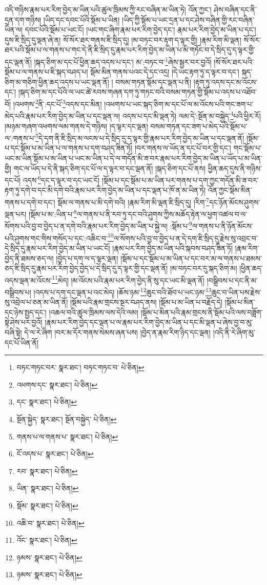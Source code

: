 འདི་གཉིས་རྣམ་པར་རིག་བྱེད་མ་ཡིན་པའི་ཚུལ་ཁྲིམས་ཀྱི་རང་བཞིན་མ་ཡིན་ཏེ། འོན་ཀྱང་། ཤེས་བཞིན་དང་ནི་དྲན་དག་གཉིས། །ཡིད་དང་དབང་པོའི་སྡོམ་པ་ཡིན། །ཡིད་ཀྱི་སྡོམ་པ་ཡང་དྲན་པ་དང་ཤེས་བཞིན་གྱི་རང་བཞིན་ཡིན་ལ། དབང་པོའི་སྡོམ་པ་ཡང་ངོ། །ཡང་གང་ཞིག་རྣམ་པར་རིག་བྱེད་དང་། རྣམ་པར་རིག་བྱེད་མ་ཡིན་པ་དང་། དུས་ཇི་སྲིད་དུ་ལྡན་ཞེ་ན། སོ་སོར་ཐར་གནས་ཇི་སྲིད་དུ། །མ་བཏང་བར་རྟག་ད་ལྟར་གྱི། །རྣམ་རིག་མི་ལྡན། སོ་སོར་ཐར་པའི་སྡོམ་པ་ལ་གནས་པ་གང་དེ་ནི་ཇི་སྲིད་དུ་རྣམ་པར་རིག་བྱེད་མ་ཡིན་པ་མི་གཏོང་བ་དེ་སྲིད་དུ་ད་ལྟར་གྱི་དང་ལྡན་ནོ། །སྐད་ཅིག་མ་དང་པོ་ཕྱིན་ཆད་འདས་པ་དང་། མ་:བཏང་བ་\footnote{བཏང་གཏང་བར་  སྣར་ཐང་། བཏང་གཏང་བ་  པེ་ཅིན། }ཞེས་སྦྱར་བར་བྱའོ། །སོ་སོར་ཐར་པའི་སྡོམ་པ་ལ་གནས་པ་ཇི་སྐད་བཤད་པ། སྡོམ་མིན་གནས་པའང་དེ་དང་འདྲ། །དེ་ཡང་རྟག་ཏུ་ད་ལྟར་བ་དང་། སྐད་ཅིག་མ་གཅིག་ཕྱིན་ཆད་འདས་པ་ཡང་ལྡན་ནོ། །
བསམ་གཏན་སྡོམ་དང་ལྡན་པ་ནི། །རྟག་ཏུ་འདས་དང་མ་འོངས་དང་། །སྐད་ཅིག་མ་དང་པོའི་ལ་ཡང་ཚེ་རབས་གཞན་དག་ཏུ་གཏང་བའི་བསམ་གཏན་གྱི་སྡོམ་པ་འདས་པ་འཐོབ་བོ། །འཕགས་\footnote{འཕགས་དང་  སྣར་ཐང་།  པེ་ཅིན། }ནི་:དང་པོ་\footnote{དང་  སྣར་ཐང་།  པེ་ཅིན། }འདས་དང་མིན། །འཕགས་པ་ཡང་སྐད་ཅིག་མ་དང་པོ་ལ་མ་འོངས་པའི་གང་ཟག་པ་མེད་པའི་རྣམ་པར་རིག་བྱེད་མ་ཡིན་པ་དང་ལྡན་ལ། འདས་པ་དང་མི་ལྡན་ཏེ། ལམ་དེ་:སྔོན་མ་བསྐྱེད་\footnote{སྔོན་སྐྱེད་  སྣར་ཐང་། སྔོན་བསྐྱེད་  པེ་ཅིན། }པའི་ཕྱིར་རོ། །མཉམ་གཞག་འཕགས་ལམ་གནས་དེ་གཉིས། །ད་ལྟར་དང་ལྡན། བསམ་གཏན་དང་ཟག་པ་མེད་པའི་སྡོམ་པ་ལ་:གནས་པ་\footnote{གནས་པ་ལ་གནས་པ་  སྣར་ཐང་།  པེ་ཅིན། }དེ་དག་ནི་ཇི་སྲིད་མ་ལངས་པ་དེ་སྲིད་དུ་ད་ལྟར་གྱི་རྣམ་པར་རིག་བྱེད་མ་ཡིན་པ་དང་ལྡན་ནོ། །སྡོམ་པ་དང་སྡོམ་པ་མ་ཡིན་པ་ལ་གནས་པ་དག་བཤད་ཟིན་ཏོ། །བར་གནས་ལ་ཡོད་ན་དང་པོ་བར་གྱི་དང་། གང་སྡོམ་པ་ཡང་མ་ཡིན་སྡོམ་པ་མ་ཡིན་པ་ཡང་མ་ཡིན་པ་དེ་ལ་གདོན་མི་ཟ་བར་རྣམ་པར་རིག་བྱེད་མ་ཡིན་པ་ཡོད་པ་མ་ཡིན་གྱི། གང་ལ་ཡོད་པ་དེ་ནི་སྐད་ཅིག་དང་པོ་ལ་ད་ལྟར་བ་དང་ལྡན་ནོ། །སྐད་ཅིག་དང་པོ་ནས། ཕྱིན་ཆད་དུས་ནི་གཉིས་དང་པོ། འདས་\footnote{ངོ་འདས་པ་  སྣར་ཐང་།  པེ་ཅིན། }དང་ད་ལྟར་བ་དང་ཡང་ངོ། །སྡོམ་པ་དང་སྡོམ་པ་མ་ཡིན་པར་གནས་པ་དག་ཀྱང་གདོན་མི་ཟ་བར་རྟག་ཏུ་དགེ་བ་དང་མི་དགེ་བའི་རྣམ་པར་རིག་བྱེད་མ་ཡིན་པ་དང་ལྡན་པ་ཁོ་ན་མ་ཡིན་ཏེ། འོན་ཀྱང་སྡོམ་མིན་གནས་པ་དགེ་བ་དང་། སྡོམ་ལ་གནས་པ་མི་དགེ་བའི། །རྣམ་རིག་མི་ལྡན་ཇི་སྲིད་དུ། །རིག་\footnote{རབ་  སྣར་ཐང་།  པེ་ཅིན། }དང་ཉོན་མོངས་ཤུགས་ལྡན་པར། །སྡོམ་པ་མ་:ཡིན་པ་\footnote{ཡིན་  སྣར་ཐང་།  པེ་ཅིན། }ལ་གནས་པ་ནི་རབ་ཏུ་དང་བའི་ཤུགས་ཀྱིས་མཆོད་རྟེན་ལ་ཕྱག་འཚལ་བ་ལ་སོགས་པའི་བྱ་བ་བྱེད་པ་ན་དགེ་བའི་རྣམ་པར་རིག་བྱེད་མ་ཡིན་པ་སྐྱེ་ལ། :སྡོམ་པ་\footnote{སྡོམ་  སྣར་ཐང་།  པེ་ཅིན། }ལ་གནས་པ་ནི་ཉོན་མོངས་པའི་ཤུགས་གང་གིས་གསོད་པ་དང་:འཆིང་བ་\footnote{འཆི་བ་  སྣར་ཐང་།  པེ་ཅིན། }ལ་སོགས་པའི་བྱ་བ་བྱེད་པ་ན་དེ་དག་ཇི་སྲིད་དུ་རྗེས་སུ་འབྲང་བ་དེ་སྲིད་དུ་རྣམ་པར་རིག་བྱེད་མ་ཡིན་པ་ཡང་ངོ། །རྣམ་པར་རིག་བྱེད་མ་ཡིན་པའི་སྐབས་བཤད་ཟིན་ཏོ། །རྣམ་རིག་བྱེད་ནི་ཐམས་ཅད་ལ། །བྱེད་པ་དག་ལ་ད་ལྟར་ལྡན། །སྡོམ་པ་དང་སྡོམ་པ་མ་ཡིན་པ་དང་བར་མ་ལ་གནས་པ་ཐམས་ཅད་ཇི་སྲིད་དུ་རྣམ་པར་རིག་བྱེད་བྱེད་པ་དེ་སྲིད་དུ་ད་ལྟར་གྱི་དང་ལྡན་ནོ། །མ་བཏང་བར་དུ་སྐད་ཅིག་མ། །ཕྱིན་ཆད་འདས་ལྡན་མ་འོངས་\footnote{འོང་  སྣར་ཐང་།  པེ་ཅིན། }མེད། །མ་འོངས་པའི་རྣམ་པར་རིག་བྱེད་ནི་སུ་དང་ཡང་མི་ལྡན་ནོ། །བསྒྲིབས་པ་དང་ནི་མ་བསྒྲིབས་པ། །འདས་པ་དག་དང་ལྡན་པ་འང་མེད། །ཆོས་ཉམ་\footnote{ཉམས་  སྣར་ཐང་།  པེ་ཅིན། }ཆུང་བའི་ཐོབ་པ་ཡང་ཉམ་\footnote{ཉམས་  སྣར་ཐང་།  པེ་ཅིན། }ཆུང་བ་ཡིན་པས་རྗེས་སུ་འབྲེལ་པ་ཅན་མ་ཡིན་ནོ། །སྡོམ་པའི་རྣམ་གྲངས་སྔར་བཤད་ནས། །སྡོམ་པ་མ་ཡིན་པ་བརྗོད་དེ། །སྡོམ་པ་མིན་དང་ཉེས་སྤྱད་དང་། །འཆལ་བའི་ཚུལ་ཁྲིམས་ལས་དེའི་ལམ། །སྡོམ་པ་མིན་པའི་རྣམ་གྲངས་ནི་སྡོམ་པའི་ལས་བཟློག་སྟེ་ཤེས་པར་བྱའོ། །རྣམ་པར་རིག་བྱེད་དང་ལྡན་པ་ལ་རྣམ་པར་རིག་བྱེད་མ་ཡིན་པ་དང་མི་ལྡན་པ་ཞེས་བྱ་བ་མུ་བཞི་སྟེ། དེ་ལ་རེ་ཞིག །བར་མ་དོར་གནས་སེམས་ཞན་པས། །བྱེད་ན་རྣམ་རིག་ཉིད་དང་ལྡན། །འདི་ནི་རེ་ཞིག་མུ་དང་པོ་ཡིན་ནོ། 